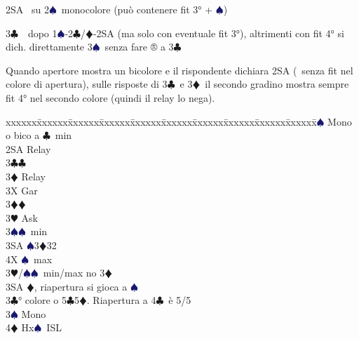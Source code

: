 \documentclass[a4paper,italian]{article}
\newcommand{\BC}{\textcolor{OliveGreen}{$\clubsuit$}}
\newcommand{\BD}{\textcolor{RedOrange}{$\vardiamondsuit$}}
\newcommand{\BH}{\textcolor{Red2}{$\varheartsuit${}}}
\newcommand{\BS}{\textcolor{MidnightBlue}{$\spadesuit${}}}
\newenvironment{bidtable}
{\begin{tabbing}

    xxxxxx\=xxxxxx\=xxxxxx\=xxxxxx\=xxxxxx\=xxxxxx\=xxxxxx\=xxxxxx\=xxxxxx\=xxxxxx\=\kill}
{\end{tabbing} }%
\newenvironment{varie}[1]
{\begin{tcolorbox}[colframe=green!40!black,title=#1]}
    {
\end{tcolorbox} }%
\begin{document}
\begin{multicols}{2}
\begin{varie}{Riepilogo mnemonico per i fissaggi}
                                            2SA \textregistered\ su 2\BS\ monocolore  (può contenere fit 3° + \BS )

                                            3\BC\ \textregistered\ dopo 1\BS-2\BC/\BD-2SA (ma solo con eventuale fit 3°), altrimenti con fit 4° si dich.
                                            direttamente 3\BS\ senza fare ® a 3\BC

                                            Quando apertore mostra un bicolore e il rispondente dichiara 2SA (\textregistered\ senza fit nel colore di apertura), sulle risposte di 3\BC\ e 3\BD\ il secondo gradino mostra sempre fit 4° nel secondo colore (quindi il relay lo nega).

                                        \end{varie}
                                        \columnbreak
                                        \begin{bidtable}
                                            2\BS \> Mono o bico a \BC\ min\+\\
                                            2SA \> Relay\+\\
                                            3\BC {}\BC \+\\
                                            3\BD \> Relay\+\\
                                            3X \> Gar\-\-\\
                                            3\BD {}\BD \+\\
                                            3\BH \> Ask\+\\
                                            3\BS {}\BS\ min\\
                                            3SA \BS 3\BD 32\\
                                            4X \BS\ max\-\-\\
                                            3\BH/\BS {}\BS\ min/max no 3\BD \\
                                            3SA \BD , riapertura si gioca a \BS \-\\
                                            3\BC {}° colore o 5\BC 5\BD . Riapertura a 4\BC\ è 5/5\+\\
                                            3\BS \> Mono\+\\
                                            4\BD \> Hx\BS\ ISL\-\-\\

\end{bidtable}
\end{multicols}
\end{document}
